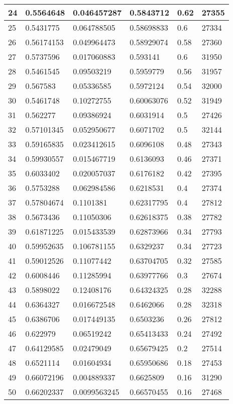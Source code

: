 \begin{longtable}{|l|l|l|l|l|l|}
24 & 0.5564648 & 0.046457287 & 0.5843712 & 0.62 & 27355 \\ \hline 
25 & 0.5431775 & 0.064788505 & 0.58698833 & 0.6 & 27334 \\ \hline 
26 & 0.56174153 & 0.049964473 & 0.58929074 & 0.58 & 27360 \\ \hline 
27 & 0.5737596 & 0.017060883 & 0.593141 & 0.6 & 31950 \\ \hline 
28 & 0.5461545 & 0.09503219 & 0.5959779 & 0.56 & 31957 \\ \hline 
29 & 0.567583 & 0.05336585 & 0.5972124 & 0.54 & 32000 \\ \hline 
30 & 0.5461748 & 0.10272755 & 0.60063076 & 0.52 & 31949 \\ \hline 
31 & 0.562277 & 0.09386924 & 0.6031914 & 0.5 & 27426 \\ \hline 
32 & 0.57101345 & 0.052950677 & 0.6071702 & 0.5 & 32144 \\ \hline 
33 & 0.59165835 & 0.023412615 & 0.6096108 & 0.48 & 27343 \\ \hline 
34 & 0.59930557 & 0.015467719 & 0.6136093 & 0.46 & 27371 \\ \hline 
35 & 0.6033402 & 0.020057037 & 0.6176182 & 0.42 & 27395 \\ \hline 
36 & 0.5753288 & 0.062984586 & 0.6218531 & 0.4 & 27374 \\ \hline 
37 & 0.57804674 & 0.1101381 & 0.62317795 & 0.4 & 27812 \\ \hline 
38 & 0.5673436 & 0.11050306 & 0.62618375 & 0.38 & 27782 \\ \hline 
39 & 0.61871225 & 0.015433539 & 0.62873966 & 0.34 & 27793 \\ \hline 
40 & 0.59952635 & 0.106781155 & 0.6329237 & 0.34 & 27723 \\ \hline 
41 & 0.59012526 & 0.11077442 & 0.63704705 & 0.32 & 27585 \\ \hline 
42 & 0.6008446 & 0.11285994 & 0.63977766 & 0.3 & 27674 \\ \hline 
43 & 0.5898022 & 0.12408176 & 0.64324325 & 0.28 & 32288 \\ \hline 
44 & 0.6364327 & 0.016672548 & 0.6462066 & 0.28 & 32318 \\ \hline 
45 & 0.6386706 & 0.017449135 & 0.6503236 & 0.26 & 27812 \\ \hline 
46 & 0.622979 & 0.06519242 & 0.65413433 & 0.24 & 27492 \\ \hline 
47 & 0.64129585 & 0.02479049 & 0.65679425 & 0.2 & 27514 \\ \hline 
48 & 0.6521114 & 0.01604934 & 0.65950686 & 0.18 & 27453 \\ \hline 
49 & 0.66072196 & 0.004889337 & 0.6625809 & 0.16 & 31290 \\ \hline 
50 & 0.66202337 & 0.0099563245 & 0.66570455 & 0.16 & 27468 \\ \hline 
\end{longtable}